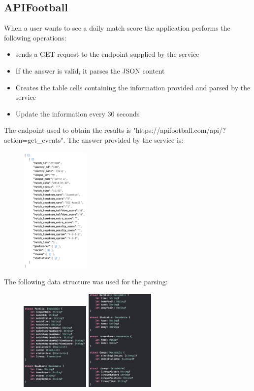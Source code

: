 \documentclass[numbers=noenddot, 12pt, a4paper, oneside]{scrbook}
\begin{document}
\subsection*{APIFootball}
When a user wants to see a daily match score the application performs the following operations:
\begin{itemize}
	\item sends a GET request to the endpoint supplied by the service
	\item If the answer is valid, it parses the JSON content
	\item Creates the table cells containing the information provided and parsed by the service 
	\item Update the information every 30 seconds
\end{itemize}
The endpoint used to obtain the results is "https://apifootball.com/api/?action=get\_events". The answer provided by the service is:
\begin{figure}[H]
	\centering
	\includegraphics[width=0.3\textwidth]{images/ResponseCompleta}
\end{figure}
The following data structure was used for the parsing:
\begin{figure}[H]
	\centering
	\includegraphics[width=0.3\textwidth]{images/StructPartita2}
	\includegraphics[width=0.3\textwidth]{images/StructPartita1}
\end{figure}
\end{document}
